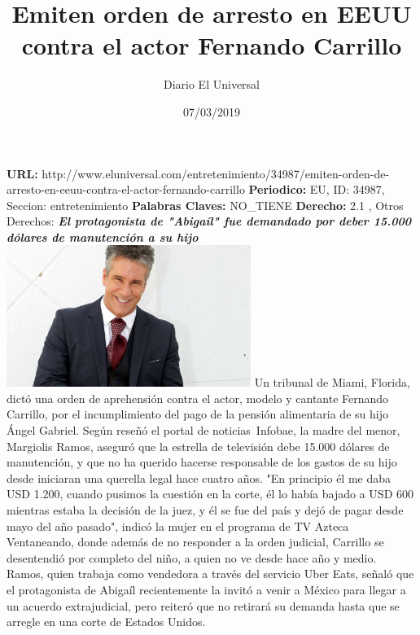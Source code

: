 \documentclass{article}%
\title{\textbf{Emiten orden de arresto en EEUU contra el actor Fernando Carrillo}}%
\author{Diario El Universal}%
\date{07/03/2019}%
\begin{document}
%
\normalsize%
\maketitle%
\textbf{URL: }%
http://www.eluniversal.com/entretenimiento/34987/emiten{-}orden{-}de{-}arresto{-}en{-}eeuu{-}contra{-}el{-}actor{-}fernando{-}carrillo\newline%
%
\textbf{Periodico: }%
EU, %
ID: %
34987, %
Seccion: %
entretenimiento\newline%
%
\textbf{Palabras Claves: }%
NO\_TIENE\newline%
%
\textbf{Derecho: }%
2.1%
, Otros Derechos: %
\newline%
%
\textbf{\textit{El protagonista de "Abigaíl" fue demandado por deber 15.000 dólares de manutención a su hijo}}%
\newline%
\newline%
%
\includegraphics[width=300px]{EU_34987.jpg}%
\newline%
%
Un tribunal de Miami, Florida, dictó una orden de aprehensión contra el actor, modelo y cantante Fernando Carrillo, por el incumplimiento del pago de la pensión alimentaria de su hijo Ángel Gabriel.%
\newline%
%
Según reseñó el portal de noticias~Infobae, la madre del menor, Margiolis Ramos, aseguró que la estrella de televisión debe 15.000 dólares de manutención, y que no ha querido hacerse responsable de los gastos de su hijo desde iniciaran una querella legal hace cuatro años.%
\newline%
%
"En principio él me daba USD 1.200, cuando pusimos la cuestión en la corte, él lo había bajado a USD 600 mientras estaba la decisión de la juez, y él se fue del país y dejó de pagar desde mayo del año pasado", indicó la mujer en el programa de TV Azteca Ventaneando, donde además de no responder a la orden judicial, Carrillo se desentendió por completo del niño, a quien no ve desde hace año y medio.%
\newline%
%
Ramos, quien trabaja como vendedora a través del servicio Uber Eats, señaló que el protagonista de Abigaíl recientemente la invitó a venir a México para llegar a un acuerdo extrajudicial, pero reiteró que no retirará su demanda hasta que se arregle en una corte de Estados Unidos.%
\end{document}
